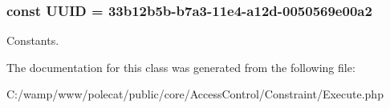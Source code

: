 \subsubsection[{U\+U\+I\+D}]{\setlength{\rightskip}{0pt plus 5cm}const U\+U\+I\+D = \textquotesingle{}33b12b5b-\/b7a3-\/11e4-\/a12d-\/0050569e00a2\textquotesingle{}}\label{class_able_polecat___access_control___constraint___execute_a74b892c8c0b86bf9d04c5819898c51e7}
Constants. 

The documentation for this class was generated from the following file\+:\begin{DoxyCompactItemize}
\item 
C\+:/wamp/www/polecat/public/core/\+Access\+Control/\+Constraint/Execute.\+php\end{DoxyCompactItemize}
